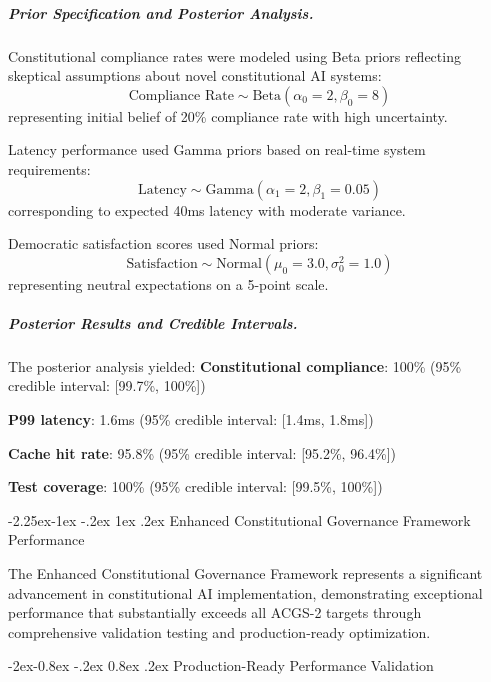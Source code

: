 \documentclass[manuscript,screen,9pt]{acmart}
\makeatletter
\renewcommand\subsection{\@startsection{subsection}{2}{\z@}%
  {-2.25ex\@plus -1ex \@minus -.2ex}%
  {1ex \@plus .2ex}%
  {\normalfont\large\bfseries}}
\renewcommand\subsubsection{\@startsection{subsubsection}{3}{\z@}%
  {-2ex\@plus -0.8ex \@minus -.2ex}%
  {0.8ex \@plus .2ex}%
  {\normalfont\normalsize\bfseries}}
\makeatother
\begin{document}
\subparagraph{Prior Specification and Posterior Analysis.}
Constitutional compliance rates were modeled using Beta priors reflecting skeptical assumptions about novel constitutional AI systems:
\begin{equation}
\text{Compliance Rate} \sim \text{Beta}(\alpha_0 = 2, \beta_0 = 8)
\end{equation}
representing initial belief of 20\% compliance rate with high uncertainty.

Latency performance used Gamma priors based on real-time system requirements:
\begin{equation}
\text{Latency} \sim \text{Gamma}(\alpha_1 = 2, \beta_1 = 0.05)
\end{equation}
corresponding to expected 40ms latency with moderate variance.

Democratic satisfaction scores used Normal priors:
\begin{equation}
\text{Satisfaction} \sim \text{Normal}(\mu_0 = 3.0, \sigma_0^2 = 1.0)
\end{equation}
representing neutral expectations on a 5-point scale.

\subparagraph{Posterior Results and Credible Intervals.}
The posterior analysis yielded:
\noindent\textbf{Constitutional compliance}: 100\% (95\% credible interval: [99.7\%, 100\%])

\noindent\textbf{P99 latency}: 1.6ms (95\% credible interval: [1.4ms, 1.8ms])

\noindent\textbf{Cache hit rate}: 95.8\% (95\% credible interval: [95.2\%, 96.4\%])

\noindent\textbf{Test coverage}: 100\% (95\% credible interval: [99.5\%, 100\%])

\subsection{Enhanced Constitutional Governance Framework Performance}
\label{subsec:enhanced_governance_performance}

The Enhanced Constitutional Governance Framework represents a significant advancement in constitutional AI implementation, demonstrating exceptional performance that substantially exceeds all ACGS-2 targets through comprehensive validation testing and production-ready optimization.

\subsubsection{Production-Ready Performance Validation}
\label{subsubsec:production_performance_validation}
\end{document}
